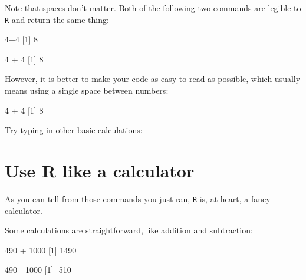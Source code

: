 \documentclass[
]{book}
\newenvironment{Shaded}{\begin{snugshade}}{\end{snugshade}}
\newcommand{\DecValTok}[1]{\textcolor[rgb]{0.00,0.00,0.81}{#1}}
\newcommand{\NormalTok}[1]{#1}
\newcommand{\SpecialCharTok}[1]{\textcolor[rgb]{0.00,0.00,0.00}{#1}}
\begin{document}
Note that spaces don't matter. Both of the following two commands are legible to \texttt{R} and return the same thing:

\begin{Shaded}
\begin{Highlighting}[]
\DecValTok{4}\SpecialCharTok{+}\DecValTok{4}
\NormalTok{[}\DecValTok{1}\NormalTok{] }\DecValTok{8}
\end{Highlighting}
\end{Shaded}

\begin{Shaded}
\begin{Highlighting}[]
\DecValTok{4}        \SpecialCharTok{+}        \DecValTok{4}
\NormalTok{[}\DecValTok{1}\NormalTok{] }\DecValTok{8}
\end{Highlighting}
\end{Shaded}

However, it is better to make your code as easy to read as possible, which usually means using a single space between numbers:

\begin{Shaded}
\begin{Highlighting}[]
\DecValTok{4} \SpecialCharTok{+} \DecValTok{4}
\NormalTok{[}\DecValTok{1}\NormalTok{] }\DecValTok{8}
\end{Highlighting}
\end{Shaded}

Try typing in other basic calculations:

\hypertarget{use-r-like-a-calculator}{%
\section*{Use R like a calculator}\label{use-r-like-a-calculator}}

As you can tell from those commands you just ran, \texttt{R} is, at heart, a fancy calculator.

Some calculations are straightforward, like addition and subtraction:

\begin{Shaded}
\begin{Highlighting}[]
\DecValTok{490} \SpecialCharTok{+} \DecValTok{1000}
\NormalTok{[}\DecValTok{1}\NormalTok{] }\DecValTok{1490}
\end{Highlighting}
\end{Shaded}

\begin{Shaded}
\begin{Highlighting}[]
\DecValTok{490} \SpecialCharTok{{-}} \DecValTok{1000}
\NormalTok{[}\DecValTok{1}\NormalTok{] }\SpecialCharTok{{-}}\DecValTok{510}
\end{Highlighting}
\end{Shaded}
\end{document}
